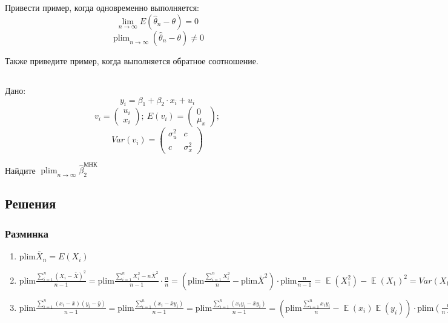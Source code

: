 \documentclass[10pt, a4paper]{extarticle}
\DeclareMathOperator{\E}{\mathbb{E}}
\DeclareMathOperator{\plim}{plim}
\begin{document}
\subsection{}

Привести пример, когда одновременно выполняется:
\[
\lim_{n \to \infty}
E(\hat \theta_{n} - \theta) = 0
\]
\[
\plim_{n \to \infty}
(\hat \theta_{n} - \theta) \neq 0
\]

Также приведите пример, когда выполняется обратное соотношение.

\subsection{}

Дано: \[ y_{i} = \beta_{1} + \beta_{2} \cdot x_{i} + u_{i}\]
\[v_{i} = \begin{pmatrix}  u_{i} \\ x_{i} \end{pmatrix}; \ E(v_{i}) = \begin{pmatrix}  0 \\ \mu_{x} \end{pmatrix};
\]
\[
Var(v_{i}) = \begin{pmatrix}  \sigma_{u}^2 & c \\
c & \sigma_{x}^2 \end{pmatrix}
\]

Найдите $\plim_{n \to \infty} \hat \beta_{2}^{\text{МНК}}$

\subsection{Решения}

\subsubsection*{Разминка}

\begin{enumerate}
	\item $\text{plim} \bar{X}_n = E(X_i)$
	
	\item $\text{plim} \frac{\sum_{i = 1}^{n}(X_i - \bar{X})^2}{n - 1} = \text{plim} \frac{\sum_{i = 1}^nX_i^2 - n \bar{X}^2}{n - 1} \cdot \frac{n}{n} = \left( \text{plim} \frac{\sum_{i = 1}^n X_i^2 }{n} - \text{plim} \bar{X}^2 \right) \cdot \text{plim}  \frac{n}{n-1} = \E(X_1^2) - \E(X_1)^2 = Var(X_1)$
	
	\item $ \text{plim} \frac{\sum_{i = 1}^n(x_i - \bar{x})(y_i - \bar{y})}{n - 1} = \text{plim}\frac{\sum_{i = 1}^n(x_i - \bar{x}y_i)}{n - 1} = \text{plim} \frac{\sum_{i = 1}^n(x_iy_i - \bar{x}y_i)}{n - 1} = \left( \text{plim} \frac{\sum_{i = 1}^nx_iy_i}{n} - \E(x_i)\E(y_i) \right) \cdot \text{plim} \left( \frac{n}{n-1} \right) = \E(XY) - \E(X)\E(Y) = (X, Y)$
	
	
\end{enumerate}
\end{document}
